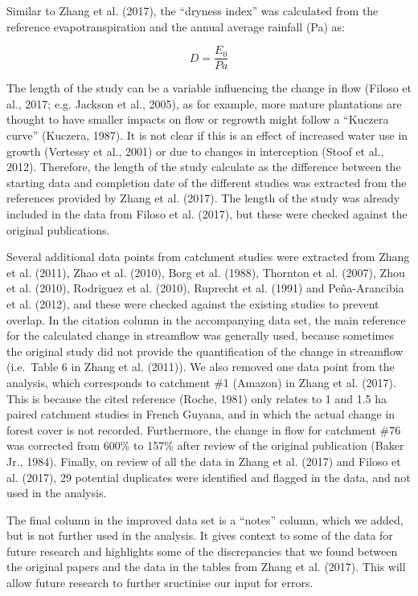 \documentclass[]{elsarticle} %
\begin{document}
Similar to Zhang et al. (2017), the ``dryness index'' was calculated from the reference evapotranspiration and the annual average rainfall (Pa) as:

\begin{equation}
D = \frac{E_{0}}{Pa} \label{eq:eq1}
\end{equation}

The length of the study can be a variable influencing the change in flow (Filoso et al., 2017; e.g. Jackson et al., 2005), as for example, more mature plantations are thought to have smaller impacts on flow or regrowth might follow a ``Kuczera curve'' (Kuczera, 1987). It is not clear if this is an effect of increased water use in growth (Vertessy et al., 2001) or due to changes in interception (Stoof et al., 2012). Therefore, the length of the study calculate as the difference between the starting data and completion date of the different studies was extracted from the references provided by Zhang et al. (2017). The length of the study was already included in the data from Filoso et al. (2017), but these were checked against the original publications.

Several additional data points from catchment studies were extracted from Zhang et al. (2011), Zhao et al. (2010), Borg et al. (1988), Thornton et al. (2007), Zhou et al. (2010), Rodriguez et al. (2010), Ruprecht et al. (1991) and Peña-Arancibia et al. (2012), and these were checked against the existing studies to prevent overlap. In the citation column in the accompanying data set, the main reference for the calculated change in streamflow was generally used, because sometimes the original study did not provide the quantification of the change in streamflow (i.e.~Table 6 in Zhang et al. (2011)).
We also removed one data point from the analysis, which corresponds to catchment \#1 (Amazon) in Zhang et al. (2017). This is because the cited reference (Roche, 1981) only relates to 1 and 1.5 ha paired catchment studies in French Guyana, and in which the actual change in forest cover is not recorded. Furthermore, the change in flow for catchment \#76 was corrected from 600\% to 157\% after review of the original publication (Baker Jr., 1984). Finally, on review of all the data in Zhang et al. (2017) and Filoso et al. (2017), 29 potential duplicates were identified and flagged in the data, and not used in the analysis.

The final column in the improved data set is a ``notes'' column, which we added, but is not further used in the analysis. It gives context to some of the data for future research and highlights some of the discrepancies that we found between the original papers and the data in the tables from Zhang et al. (2017). This will allow future research to further sructinise our input for errors.
\end{document}

